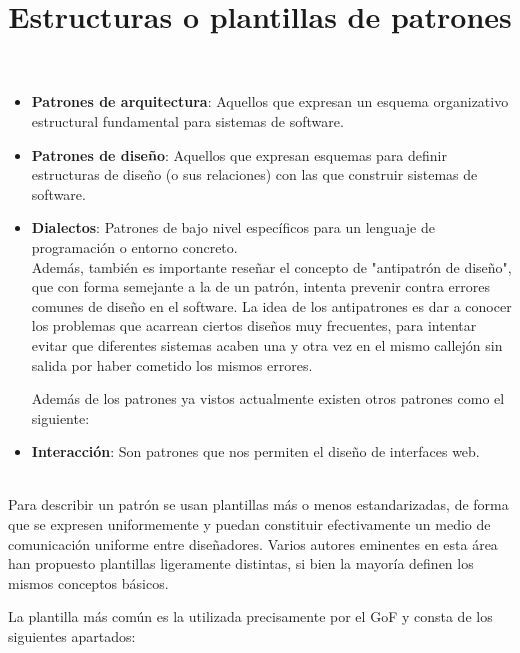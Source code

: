 \documentclass[a4paper,10pt]{report}
\begin{document}
\begin{itemize}
    \item{\textbf{Patrones de arquitectura}: Aquellos que expresan un esquema organizativo estructural fundamental para sistemas de software.}
    \item{\textbf{Patrones de diseño}: Aquellos que expresan esquemas para definir estructuras de diseño (o sus relaciones) con las que construir sistemas de software.}
    \item{\textbf{Dialectos}: Patrones de bajo nivel específicos para un lenguaje de programación o entorno concreto.\\}
Además, también es importante reseñar el concepto de "antipatrón de diseño", que con forma semejante a la de un patrón, intenta prevenir contra errores comunes de diseño en el software. La idea de los antipatrones es dar a conocer los problemas que acarrean ciertos diseños muy frecuentes, para intentar evitar que diferentes sistemas acaben una y otra vez en el mismo callejón sin salida por haber cometido los mismos errores.

Además de los patrones ya vistos actualmente existen otros patrones como el siguiente:\\
    \item{\textbf{Interacción}: Son patrones que nos permiten el diseño de interfaces web.}
\end{itemize}

\title{\textbf{Estructuras o plantillas de patrones}}\\

Para describir un patrón se usan plantillas más o menos estandarizadas, de forma que se expresen uniformemente y puedan constituir efectivamente un medio de comunicación uniforme entre diseñadores. Varios autores eminentes en esta área han propuesto plantillas ligeramente distintas, si bien la mayoría definen los mismos conceptos básicos.

La plantilla más común es la utilizada precisamente por el GoF y consta de los siguientes apartados:\\
\end{document}
